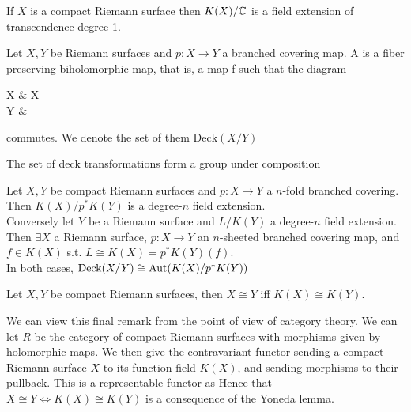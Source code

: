 \documentclass{article}
\begin{document}
\begin{prop}
	If $X$ is a compact Riemann surface then $K(X)/\mathbb{C}$ is a field extension of transcendence degree 1.  
\end{prop}

\begin{definition}
	Let $X, Y$ be Riemann surfaces and $p : X \to Y$ a branched covering map. A  is a fiber preserving biholomorphic map, that is, a map f such that the diagram
	\begin{tkz}
		X \arrow[r,"f"] \arrow[d,"p"'] & X \arrow[dl,"p"]\\
		Y &
	\end{tkz}
	commutes. We denote the set of them  $\text{Deck}(X/Y)$
\end{definition}

\begin{prop}
	The set of deck transformations form a group under composition
\end{prop}

\begin{theorem}
	Let $X,Y$ be compact Riemann surfaces and $p:X \to Y$ a $n$-fold branched covering. Then $K(X)/p^\ast K(Y)$ is a degree-$n$ field extension. \\
	Conversely let $Y$ be a Riemann surface and $L/K(Y)$ a degree-$n$ field extension. Then $\exists X$ a Riemann surface, $p:X \to Y$ an $n$-sheeted branched covering map, and $f \in K(X)$ s.t. $L\cong K(X)=p^\ast K(Y)(f)$. \\
	In both cases, $\text{Deck}(X/Y) \cong \operatorname{Aut}(K(X) / p^\ast K(Y))$  
\end{theorem}

\begin{corollary}
	Let $X,Y$ be compact Riemann surfaces, then $X\cong Y$ iff $K(X) \cong K(Y)$. 
\end{corollary}

\begin{remark}
	We can view this final remark from the point of view of category theory. We can let $R$ be the category of compact Riemann surfaces with morphisms given by holomorphic maps. We then give the contravariant functor 
	sending a compact Riemann surface $X$ to its function field $K(X)$, and sending morphisms to their pullback. This is a representable functor as 
	Hence that $X \cong Y \Leftrightarrow K(X) \cong K(Y)$ is a consequence of the Yoneda lemma. 
\end{remark}
\end{document}
